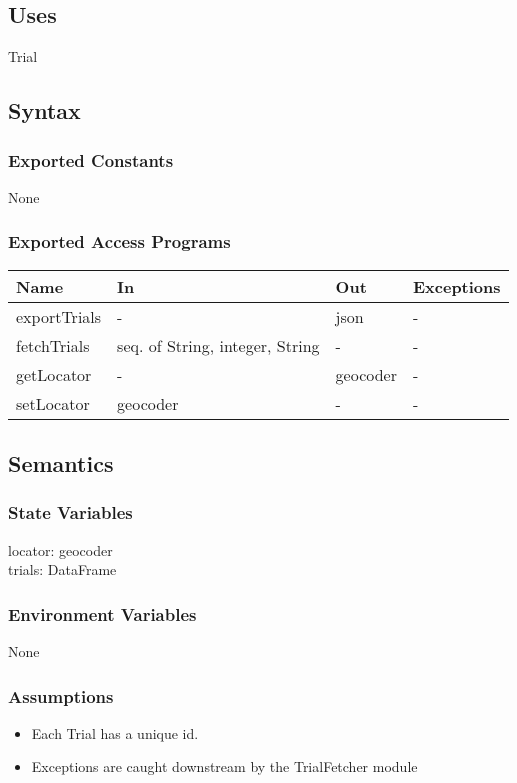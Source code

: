 \documentclass[12pt, titlepage]{article}
\begin{document}
\subsection{Uses}

Trial

\subsection{Syntax}

\subsubsection{Exported Constants}
None

\subsubsection{Exported Access Programs}

\begin{center}
\begin{tabular}{p{4cm} p{4cm} p{4cm} p{4cm}}
\hline
\textbf{Name} & \textbf{In} & \textbf{Out} & \textbf{Exceptions} \\
\hline
exportTrials & - & json & - \\
\hline
fetchTrials & seq. of String, integer, String & - & - \\
\hline
getLocator & - & geocoder & - \\
\hline
setLocator & geocoder & - & - \\
\hline
\end{tabular}
\end{center}

\subsection{Semantics}

\subsubsection{State Variables}
locator: geocoder \\
trials: DataFrame

\subsubsection{Environment Variables}
None

\subsubsection{Assumptions}
\begin{itemize}
  \item Each Trial has a unique id.
  \item Exceptions are caught downstream by the TrialFetcher module
\end{itemize}
\end{document}
